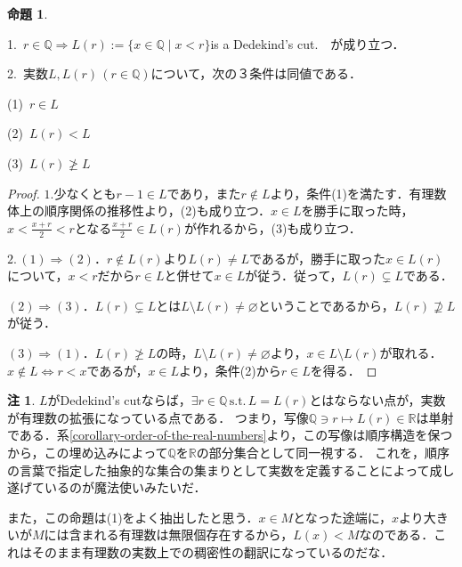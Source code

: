 \documentclass[uplatex, 12pt, dvipdfmx]{jsreport}
\theoremstyle{definition}
\newtheorem{proposition}[theorem]{命題}
\newtheorem{remark}[theorem]{注}
\theoremstyle{StatementsWithStar}
\theoremstyle{StatementsWithStar2}
\theoremstyle{StatementsWithStar3}
\theoremstyle{StatementsWithCCirc}
\theoremstyle{definition}
\begin{document}
\begin{proposition}\rm{}\label{prop-order-of-the-real-numbers}　

    1.\, $r\in\mathbb{Q}\Rightarrow L(r):=\{ x\in\mathbb{Q}\mid x<r \}$is a Dedekind's cut.　が成り立つ．

    2.\, 実数$L, L(r)\,(r\in\mathbb{Q})$について，次の３条件は同値である．


    (1)\, $r\in L$

    (2)\, $L(r)< L$

    (3)\, $L(r)\ngeq L$
\end{proposition}
\begin{proof}\rm{}
    $1.$少なくとも$r-1\in L$であり，また$r\notin L$より，条件(1)を満たす．有理数体上の順序関係の推移性より，(2)も成り立つ．$x\in L$を勝手に取った時，$x<\frac{x+r}{2}<r$となる$\frac{x+r}{2}\in L(r)$が作れるから，(3)も成り立つ．

    $2.\,(1)\Rightarrow(2)$．$r\notin L(r)$より$L(r)\neq L$であるが，勝手に取った$x\in L(r)$について，$x<r$だから$r\in L$と併せて$x\in L$が従う．従って，$L(r)\subsetneq L$である．

    $(2)\Rightarrow(3)$．$L(r)\subsetneq L$とは$L\setminus L(r)\neq\varnothing$ということであるから，$L(r)\nsupseteq L$が従う．

    $(3)\Rightarrow(1)$．$L(r)\ngeq L$の時，$L\setminus L(r)\neq\varnothing$より，$x\in L\setminus L(r)$が取れる．$x\notin L \Leftrightarrow r<x$であるが，$x\in L$より，条件(2)から$r\in L$を得る．
\end{proof}
\begin{remark}\rm{}
    $L$がDedekind's cutならば，$\exists r\in\mathbb{Q}\,\mathrm{s.t.}\, L=L(r)$とはならない点が，実数が有理数の拡張になっている点である．
    つまり，写像$\mathbb{Q}\ni r\mapsto L(r)\in\mathbb{R}$は単射である．系\ref{corollary-order-of-the-real-numbers}より，この写像は順序構造を保つから，この埋め込みによって$\mathbb{Q}$を$\mathbb{R}$の部分集合として同一視する．
    これを，順序の言葉で指定した抽象的な集合の集まりとして実数を定義することによって成し遂げているのが魔法使いみたいだ．

    また，この命題は(1)をよく抽出したと思う．$x\in M$となった途端に，$x$より大きいが$M$には含まれる有理数は無限個存在するから，$L(x)<M$なのである．これはそのまま有理数の実数上での稠密性の翻訳になっているのだな．
\end{remark}
\end{document}
